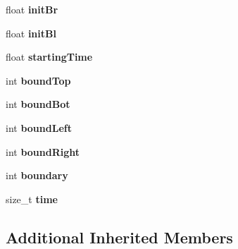\begin{DoxyCompactItemize}
\item 
\hypertarget{classSWE__CheckpointScenario_a093d47db439294ab25e696cbe57f75f5}{float {\bfseries init\-Br}}\label{classSWE__CheckpointScenario_a093d47db439294ab25e696cbe57f75f5}

\item 
\hypertarget{classSWE__CheckpointScenario_af85359592a224c76c520935b1350dbe2}{float {\bfseries init\-Bl}}\label{classSWE__CheckpointScenario_af85359592a224c76c520935b1350dbe2}

\item 
\hypertarget{classSWE__CheckpointScenario_a717b4f732979717a3f3b1eb62c1d8a44}{float {\bfseries starting\-Time}}\label{classSWE__CheckpointScenario_a717b4f732979717a3f3b1eb62c1d8a44}

\item 
\hypertarget{classSWE__CheckpointScenario_a5bc29ca2b4e020ac6ae8de493d5cc77f}{int {\bfseries bound\-Top}}\label{classSWE__CheckpointScenario_a5bc29ca2b4e020ac6ae8de493d5cc77f}

\item 
\hypertarget{classSWE__CheckpointScenario_af8cf3d28e16a108ae3f4655ffd04fd32}{int {\bfseries bound\-Bot}}\label{classSWE__CheckpointScenario_af8cf3d28e16a108ae3f4655ffd04fd32}

\item 
\hypertarget{classSWE__CheckpointScenario_a0c657485ba4549bed67244dddb02d3de}{int {\bfseries bound\-Left}}\label{classSWE__CheckpointScenario_a0c657485ba4549bed67244dddb02d3de}

\item 
\hypertarget{classSWE__CheckpointScenario_a9e36e3a30caef5d2eb6da8409174d81d}{int {\bfseries bound\-Right}}\label{classSWE__CheckpointScenario_a9e36e3a30caef5d2eb6da8409174d81d}

\item 
\hypertarget{classSWE__CheckpointScenario_a596f3be70df55a122e2eb8572ae5be1c}{int {\bfseries boundary}}\label{classSWE__CheckpointScenario_a596f3be70df55a122e2eb8572ae5be1c}

\item 
\hypertarget{classSWE__CheckpointScenario_a0dc427e4ca62880e51d1862447c43b90}{size\-\_\-t {\bfseries time}}\label{classSWE__CheckpointScenario_a0dc427e4ca62880e51d1862447c43b90}

\end{DoxyCompactItemize}
\subsection*{Additional Inherited Members}


